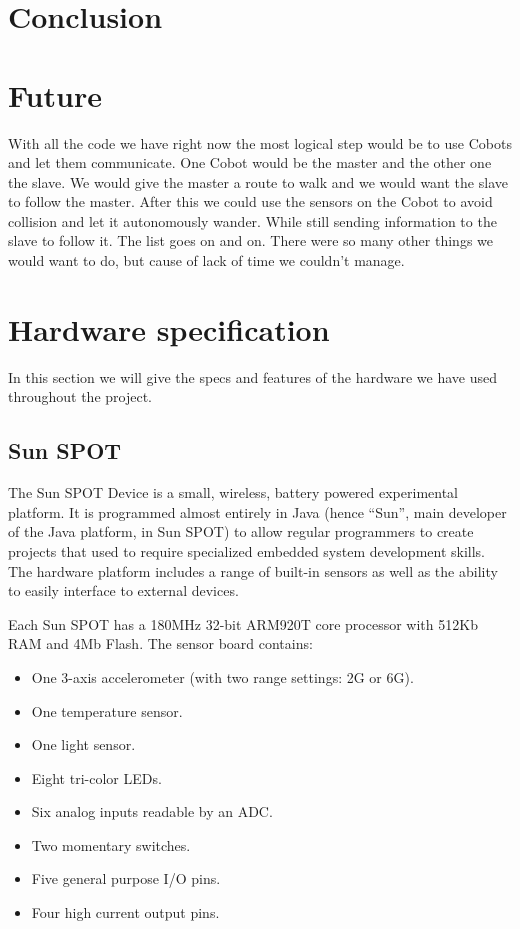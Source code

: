 \documentclass[a4paper,10pt]{article} %
\begin{document}

\section{Conclusion} %


\section{Future} %
\label{sec:future}

With all the code we have right now the most logical step would be to use Cobots
and let them communicate. One Cobot would be the master and the other one the
slave. We would give the master a route to walk and we would want the slave to
follow the master. After this we could use the sensors on the Cobot to avoid
collision and let it autonomously wander. While still sending information to the
slave to follow it. The list goes on and on. There were so many other things we
would want to do, but cause of lack of time we couldn't manage.


\appendix

\section{Hardware specification} %
\label{app:hardware}

In this section we will give the specs and features of the hardware we have used
throughout the project.

\subsection{Sun SPOT} %
\label{app:Sun SPOT}

The Sun SPOT Device is a small, wireless, battery powered experimental platform.
It is programmed almost entirely in Java (hence ``Sun'', main developer of the
Java platform, in Sun SPOT) to allow regular programmers to create projects that
used to require specialized embedded system development skills. The hardware
platform includes a range of built-in sensors as well as the ability to easily
interface to external devices.

Each Sun SPOT has a 180MHz 32-bit ARM920T core processor with 512Kb RAM and 4Mb
Flash. The sensor board contains:

\begin{itemize}
    \item One 3-axis accelerometer (with two range settings: 2G or 6G).
    \item One temperature sensor.
    \item One light sensor.
    \item Eight tri-color LEDs.
    \item Six analog inputs readable by an ADC.
    \item Two momentary switches.
    \item Five general purpose I/O pins.
    \item Four high current output pins.
\end{itemize}
\end{document}
